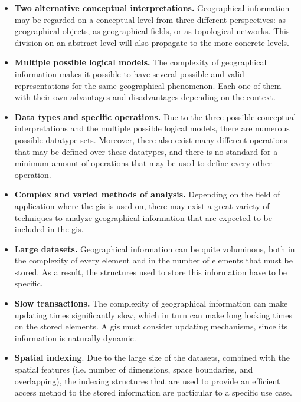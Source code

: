     \begin{itemize}
        \item \textbf{Two alternative conceptual interpretations.} Geographical information may be regarded on a conceptual level from three different perspectives: as geographical objects, as geographical fields, or as topological networks. This division on an abstract level will also propagate to the more concrete levels.
        
        \item \textbf{Multiple possible logical models.} The complexity of geographical information makes it possible to have several possible and valid representations for the same geographical phenomenon. Each one of them with their own advantages and disadvantages depending on the context.
        
        \item \textbf{Data types and specific operations.} Due to the three possible conceptual interpretations and the multiple possible logical models, there are numerous possible datatype sets. Moreover, there also exist many different operations that may be defined over these datatypes, and there is no standard for a minimum amount of operations that may be used to define every other operation.
        
        \item \textbf{Complex and varied methods of analysis.} Depending on the field of application where the \gls{gis} is used on, there may exist a great variety of techniques to analyze geographical information that are expected to be included in the \gls{gis}.
        
        \item \textbf{Large datasets.} Geographical information can be quite voluminous, both in the complexity of every element and in the number of elements that must be stored. As a result, the structures used to store this information have to be specific.
        
        \item \textbf{Slow transactions.} The complexity of geographical information can make updating times significantly slow, which in turn can make long locking times on the stored elements. A \gls{gis} must consider updating mechanisms, since its information is naturally dynamic.
        
        \item \textbf{Spatial indexing}. Due to the large size of the datasets, combined with the spatial features (i.e. number of dimensions, space boundaries, and overlapping), the indexing structures that are used to provide an efficient access method to the stored information are particular to a specific use case.
        

\end{itemize}
